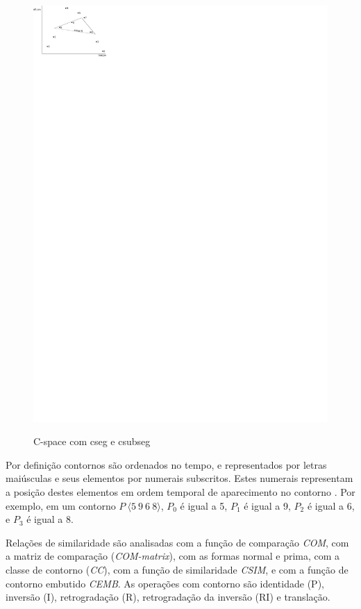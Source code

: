\documentclass[brazil]{article}
\newcommand{\termo}[1]{\textit{#1}}
\begin{document}
\begin{figure}
{    \includegraphics{cspace-564}
    \label{fig:c-space564}
  }
  \caption{C-space com cseg e csubseg}
  \label{fig:c-space}
\end{figure}

Por definição contornos são ordenados no tempo, e representados por
letras maiúsculas e seus elementos por numerais subscritos. Estes
numerais representam a posição destes elementos em ordem temporal de
aparecimento no contorno \cite{marvin.ea87:relating}. Por exemplo, em
um contorno $P\:\langle5\:9\:6\:8\rangle$, $P_0$ é igual a 5, $P_1$ é
igual a 9, $P_2$ é igual a 6, e $P_3$ é igual a 8.

Relações de similaridade \cite{marvin.ea87:relating} são analisadas
com a função de comparação \termo{COM}, com a matriz de comparação
(\termo{COM-matrix}), com as formas normal e prima, com a classe de
contorno (\termo{CC}), com a função de similaridade \termo{CSIM}, e
com a função de contorno embutido \termo{CEMB}. As operações com
contorno são identidade (P), inversão (I), retrogradação (R),
retrogradação da inversão (RI) e translação.
\end{document}
